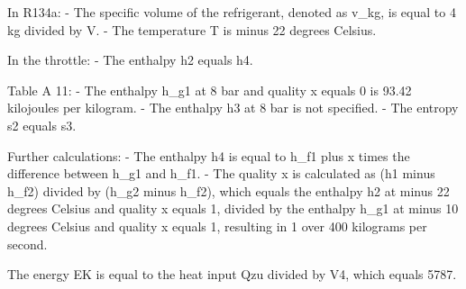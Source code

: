 In R134a:
- The specific volume of the refrigerant, denoted as v_kg, is equal to 4 kg divided by V.
- The temperature T is minus 22 degrees Celsius.

In the throttle:
- The enthalpy h2 equals h4.

Table A 11:
- The enthalpy h_g1 at 8 bar and quality x equals 0 is 93.42 kilojoules per kilogram.
- The enthalpy h3 at 8 bar is not specified.
- The entropy s2 equals s3.

Further calculations:
- The enthalpy h4 is equal to h_f1 plus x times the difference between h_g1 and h_f1.
- The quality x is calculated as (h1 minus h_f2) divided by (h_g2 minus h_f2), which equals the enthalpy h2 at minus 22 degrees Celsius and quality x equals 1, divided by the enthalpy h_g1 at minus 10 degrees Celsius and quality x equals 1, resulting in 1 over 400 kilograms per second.

The energy EK is equal to the heat input Qzu divided by V4, which equals 5787.